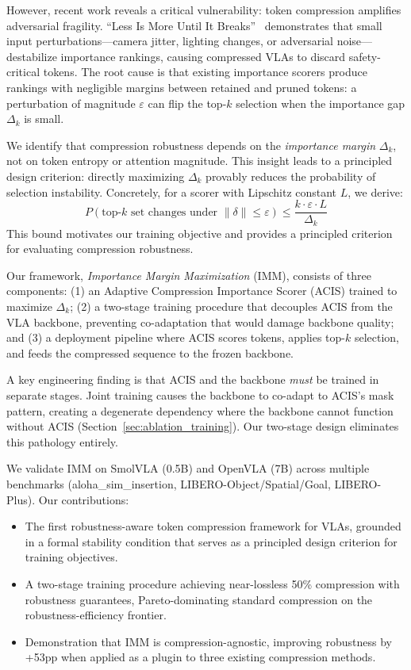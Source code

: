 \documentclass[conference]{corl_2026}
\newcommand{\ours}{IMM}
\newcommand{\acis}{ACIS}
\newcommand{\deltak}{\Delta_k}
\begin{document}
However, recent work reveals a critical vulnerability: token compression amplifies adversarial fragility. ``Less Is More Until It Breaks''~\cite{lessismore} demonstrates that small input perturbations---camera jitter, lighting changes, or adversarial noise---destabilize importance rankings, causing compressed VLAs to discard safety-critical tokens. The root cause is that existing importance scorers produce rankings with negligible margins between retained and pruned tokens: a perturbation of magnitude $\varepsilon$ can flip the top-$k$ selection when the importance gap $\deltak$ is small.

We identify that compression robustness depends on the \emph{importance margin} $\deltak$, not on token entropy or attention magnitude. This insight leads to a principled design criterion: directly maximizing $\deltak$ provably reduces the probability of selection instability. Concretely, for a scorer with Lipschitz constant $L$, we derive:
\begin{equation}
P(\text{top-}k \text{ set changes under } \|\delta\| \leq \varepsilon) \leq \frac{k \cdot \varepsilon \cdot L}{\deltak}
\label{eq:bound}
\end{equation}
This bound motivates our training objective and provides a principled criterion for evaluating compression robustness.

Our framework, \emph{Importance Margin Maximization} (\ours{}), consists of three components: (1) an Adaptive Compression Importance Scorer (\acis{}) trained to maximize $\deltak$; (2) a two-stage training procedure that decouples \acis{} from the VLA backbone, preventing co-adaptation that would damage backbone quality; and (3) a deployment pipeline where \acis{} scores tokens, applies top-$k$ selection, and feeds the compressed sequence to the frozen backbone.

A key engineering finding is that \acis{} and the backbone \emph{must} be trained in separate stages. Joint training causes the backbone to co-adapt to \acis{}'s mask pattern, creating a degenerate dependency where the backbone cannot function without \acis{} (Section~\ref{sec:ablation_training}). Our two-stage design eliminates this pathology entirely.

We validate \ours{} on SmolVLA (0.5B) and OpenVLA (7B) across multiple benchmarks (aloha\_sim\_insertion, LIBERO-Object/Spatial/Goal, LIBERO-Plus). Our contributions:
\begin{itemize}
\item The first robustness-aware token compression framework for VLAs, grounded in a formal stability condition that serves as a principled design criterion for training objectives.
\item A two-stage training procedure achieving near-lossless 50\% compression with robustness guarantees, Pareto-dominating standard compression on the robustness-efficiency frontier.
\item Demonstration that \ours{} is compression-agnostic, improving robustness by +53pp when applied as a plugin to three existing compression methods.
\end{itemize}
\end{document}

